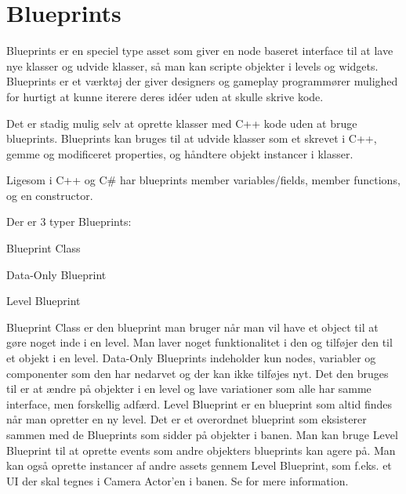\section{Blueprints}
Blueprints er en speciel type asset som giver en node baseret interface til at lave nye klasser og udvide klasser, så man kan scripte objekter i levels og widgets. Blueprints er et værktøj der giver designers og gameplay programmører mulighed for hurtigt at kunne iterere deres idéer uden at skulle skrive kode.

Det er stadig mulig selv at oprette klasser med C++ kode uden at bruge blueprints. Blueprints kan bruges til at udvide klasser som et skrevet i C++, gemme og modificeret properties, og håndtere objekt instancer i klasser.

Ligesom i C++ og C\# har blueprints member variables/fields, member functions, og en constructor.

\begin{list}{}{}
\item[Der er 3 typer Blueprints:]
\item[Blueprint Class]
\item[Data-Only Blueprint]
\item[Level Blueprint]
\end{list}

Blueprint Class er den blueprint man bruger når man vil have et object til at gøre noget inde i en level. Man laver noget funktionalitet i den og tilføjer den til et objekt i en level. Data-Only Blueprints indeholder kun nodes, variabler og componenter som den har nedarvet og der kan ikke tilføjes nyt. Det den bruges til er at ændre på objekter i en level og lave variationer som alle har samme interface, men forskellig adfærd. Level Blueprint er en blueprint som altid findes når man opretter en ny level. Det er et overordnet blueprint som eksisterer sammen med de Blueprints som sidder på objekter i banen. Man kan bruge Level Blueprint til at oprette events som andre objekters blueprints kan agere på. Man kan også oprette instancer af andre assets gennem Level Blueprint, som f.eks. et UI der skal tegnes i Camera Actor'en i banen. Se \cite{blueprint} for mere information.
